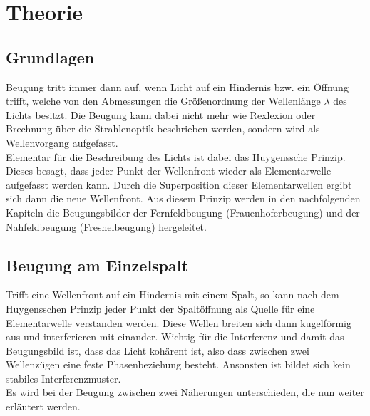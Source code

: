 \section{Theorie}
\label{sec:Theorie}
\subsection{Grundlagen}
\label{sec:grundlagen}
Beugung tritt immer dann auf, wenn Licht auf ein Hindernis bzw. ein Öffnung trifft, welche von den Abmessungen die Größenordnung der Wellenlänge $\lambda$ des Lichts
besitzt. Die Beugung kann dabei nicht mehr wie Rexlexion oder Brechnung über die Strahlenoptik beschrieben werden, sondern wird als Wellenvorgang
aufgefasst.
\\\noindent
Elementar für die Beschreibung des Lichts ist dabei das Huygenssche Prinzip. Dieses besagt, dass jeder Punkt der Wellenfront wieder als Elementarwelle
aufgefasst werden kann. Durch die Superposition dieser Elementarwellen ergibt sich dann die neue Wellenfront. Aus diesem Prinzip werden in den nachfolgenden
Kapiteln die Beugungsbilder der Fernfeldbeugung (Frauenhoferbeugung) und der Nahfeldbeugung (Fresnelbeugung) hergeleitet.

\subsection{Beugung am Einzelspalt}
\label{sec:einzel}
Trifft eine Wellenfront auf ein Hindernis mit einem Spalt, so kann nach dem Huygensschen Prinzip jeder Punkt der Spaltöffnung als Quelle für eine Elementarwelle
verstanden werden. Diese Wellen breiten sich dann kugelförmig aus und interferieren mit einander. Wichtig für die Interferenz und damit das Beugungsbild ist,
dass das Licht kohärent ist, also dass zwischen zwei Wellenzügen eine feste Phasenbeziehung besteht. Ansonsten ist bildet sich kein stabiles Interferenzmuster.
\\\noindent
Es wird bei der Beugung zwischen zwei Näherungen unterschieden,
die nun weiter erläutert werden.

